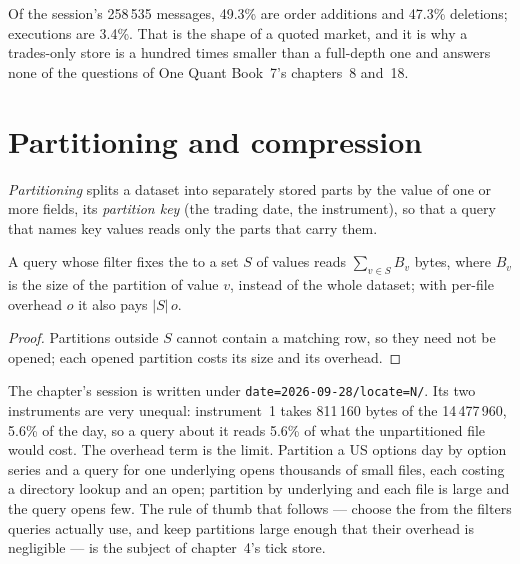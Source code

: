 \label{lst:pl:capturing-and-storing-tick-data:delta}

\begin{remark}\label{rem:pl:capturing-and-storing-tick-data:mix}
Of the session's 258\,535 messages, 49.3\% are order additions and 47.3\% deletions; executions are 3.4\%. That is the shape of
a quoted market, and it is why a trades-only store is a hundred times smaller than a full-depth one and answers none of the
questions of One Quant Book~7's chapters~8 and~18.
\end{remark}

\section{Partitioning and compression}

\begin{definition}\label{def:pl:capturing-and-storing-tick-data:partition}
\emph{Partitioning} splits a dataset into separately stored parts by the value of one or more fields, its
\emph{partition key} (the trading date, the instrument), so that a query that names key values reads only
the parts that carry them.
\end{definition}

\begin{proposition}[Pruning]\label{prop:pl:capturing-and-storing-tick-data:pruning}
A query whose filter fixes the  to a set $S$ of values reads $\sum_{v\in S} B_v$ bytes, where $B_v$ is the size of
the partition of value $v$, instead of the whole dataset; with per-file overhead $o$ it also pays $|S|\,o$.
\end{proposition}

\begin{proof}
Partitions outside $S$ cannot contain a matching row, so they need not be opened; each opened partition costs its size and its
overhead.
\end{proof}

The chapter's session is written under \texttt{date=2026-09-28/locate=N/}. Its two instruments are very unequal: instrument~1
takes 811\,160 bytes of the 14\,477\,960, 5.6\% of the day, so a query about it reads 5.6\% of what the unpartitioned file would
cost. The overhead term is the limit. Partition a US options day by option series and a query for one underlying opens
thousands of small files, each costing a directory lookup and an open; partition by underlying and each file is large and the
query opens few. The rule of thumb that follows --- choose the  from the filters queries actually use, and keep
partitions large enough that their overhead is negligible --- is the subject of chapter~4's tick store.

